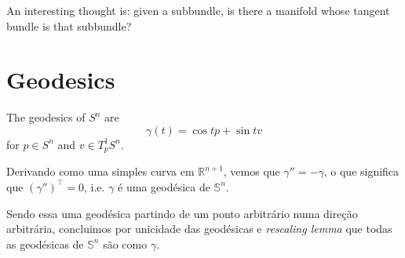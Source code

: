 An interesting thought is: given a subbundle,
is there a manifold whose tangent
bundle is that subbundle?

\section{Geodesics}
\label{section-geodesics}

\begin{example}
\label{example-geodesics-of-Sn}
The geodesics of $S^n$ are
\begin{equation}
\label{equation-geodesics-of-Sn}
\gamma(t)=\cos t p+\sin t v
\end{equation}
for $p \in S^n$ and $v\in T^1_pS^n$.

Derivando como uma simples curva em
$\mathbb{R}^{n+1}$, vemos que
$\gamma''=-\gamma$, o que significa que
$(\gamma'')^{\top}=0$, i.e. $\gamma$ é
uma geodésica de $\mathbb{S}^n$.

Sendo essa uma geodésica partindo de um ponto
arbitrário numa direção
arbitrária, concluimos por unicidade das
geodésicas e \textit{rescaling lemma}
que todas as geodésicas de $\mathbb{S}^n$ são
como $\gamma$.
\end{example}

